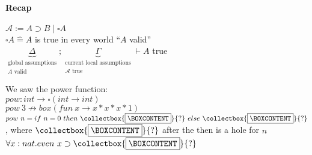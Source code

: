 \documentclass[12 pt]{article}
\newcommand{\mybox}{%
\collectbox{%
	\setlength{\fboxsep}{3pt}%
	\fbox{\BOXCONTENT}%
	}%
}
\begin{document}
\paragraph{Recap}
$\mathcal{A} := A \supset B \mid \square A$
\\ $\square A \hat{=} A$ is true in every world ``$A$ valid''
\\ $\underbrace{\Delta}_{\substack{\text{global assumptions}\\A
		\text{ valid}}};
	\underbrace{\Gamma}_{\substack{\text{current local
			assumptions}\\ \mathcal{A} \text{ true}}} \vdash
	A$ true
\begin{prooftree}
\end{prooftree}
\begin{prooftree}
\end{prooftree}
\begin{prooftree}
\end{prooftree}
We saw the power function:
\\$pow : int \to \square (int \to int)$
	\\ $pow\ 3 \nrightarrow box(fun\ x \to x * x * x * 1)$
	\\ $pow\ n = if\ n = 0 \ then \ \mybox{?}\ else\ \mybox{?}$,
	where $\mybox{?}$ after the then is a hole for $n$
	\\$\forall x : nat. even\ x \supset \mybox{?}$
\end{document}

